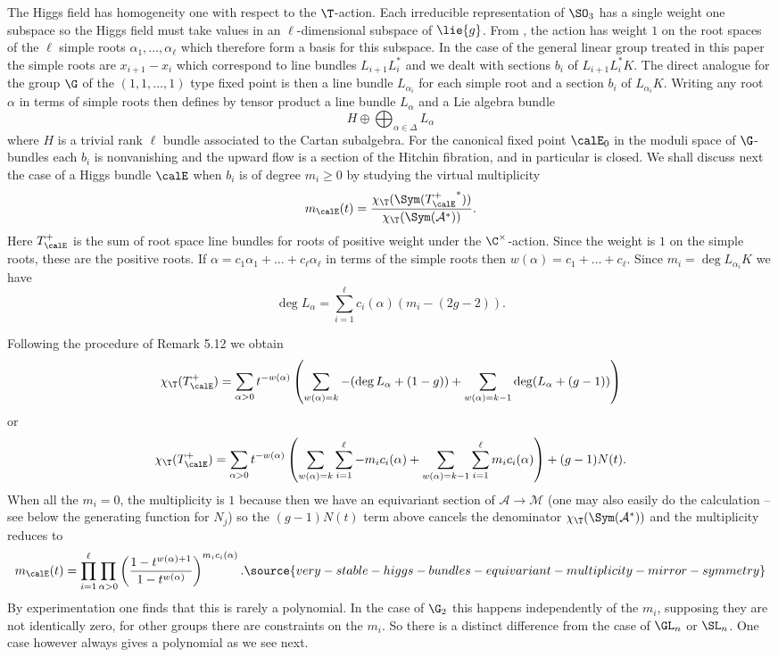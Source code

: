 The  Higgs field  has homogeneity one with respect to the $\T$-action. Each  irreducible representation of $\SO_3$  has a single weight one subspace so the Higgs field must take values  in an $\ell$-dimensional subspace of $\lie{g}$. From \cite[Lemma 5.2]{Kos}, the action has  weight $1$ on the root spaces of the $\ell$ simple roots $\alpha_1,\dots, \alpha_{\ell}$ which therefore form a basis for this subspace.  In the case of the general linear group  treated in this paper   the simple roots are $x_{i+1}-x_i$ which correspond to line bundles  $L_{i+1}L_i^*$ and we dealt with  sections $b_i$ of $L_{i+1}L_i^*K$. The direct analogue for the group $\G$  of the $(1,1,\dots,1)$ type  fixed point is then a line bundle $L_{\alpha_i}$ for each simple root and a section $b_i$ of $L_{\alpha_i}K$. Writing any root $\alpha$ in terms of simple roots then defines by tensor product a line bundle $L_{\alpha}$ and a Lie algebra bundle
$$H\oplus \bigoplus_{\alpha\in \Delta}L_{\alpha}$$
where $H$ is a trivial rank $\ell$ bundle associated to the Cartan subalgebra. For the canonical fixed point $\calE_0$  in the moduli space of $\G$-bundles each $b_i$ is nonvanishing and the upward flow is a section of the Hitchin fibration, and in particular is closed. We shall discuss next the case of a Higgs bundle $\calE$ when $b_i$ is of degree $m_i\ge 0$ by studying the virtual multiplicity $$m_\calE(t)=\frac{\chi_{\T}(\Sym ({T_\calE^+}^*))}{\chi_{\T}(\Sym ({\mathcal A}^*))}.$$
Here $T_\calE^+$ is the sum of root space line bundles for roots of positive weight under the $\C^{\times}$-action. Since the weight is $1$ on the simple roots, these are the positive roots. If  $\alpha=c_1\alpha_1+\dots+c_{\ell}\alpha_{\ell}$ in terms of the simple roots then $w(\alpha)=c_1+\dots+c_{\ell}$.   Since $m_i=\deg L_{\alpha_i}K$ we have
$$\deg L_{\alpha}=\sum_{i=1}^{\ell} c_i(\alpha) (m_i-(2g-2)). $$


Following the procedure of  Remark 5.12 we obtain
$$\chi_\T(T_\calE^+)=\sum_{\alpha>0} t^{-w(\alpha)}\left(\sum_{w(\alpha)=k}-(\deg L_{\alpha}+(1-g))+\sum_{w(\alpha)=k-1}\deg(L_{\alpha}+(g-1))\right)$$
or
$$\chi_\T(T_\calE^+)=\sum_{\alpha>0} t^{-w(\alpha)}\left(\sum_{w(\alpha)=k}\sum_{i=1}^{\ell} -m_ic_i(\alpha) +\sum_{w(\alpha)=k-1}\sum_{i=1}^{\ell} m_ic_i(\alpha) \right)+(g-1)N(t).$$
When all the $m_i=0$, the multiplicity is $1$ because then we have an equivariant section of ${\mathcal A}\rightarrow {\mathcal M}$ (one may also easily do the calculation -- see below the generating function for $N_j$) so the $(g-1)N(t)$ term above cancels the denominator ${\chi_{\T}(\Sym ({\mathcal A}^*))}$ and the multiplicity reduces to
\begin{equation}
m_\calE(t)=\prod_{i=1}^{\ell}\prod_{\alpha>0}\left(\frac{1-t^{w(\alpha)+1}}{1-t^{w(\alpha)}}\right)^{m_ic_i(\alpha)}.
\label{multG}
\source{very-stable-higgs-bundles-equivariant-multiplicity-mirror-symmetry}
\end{equation}
By experimentation one finds that this is rarely a polynomial. In the case of ${\G}_2$ this happens independently of the $m_i$, supposing they are not identically zero, for other groups there are constraints on the $m_i$. So there is a distinct difference from the case of $\GL_n$ or $\SL_n$. One case however always gives a polynomial as we see next.

